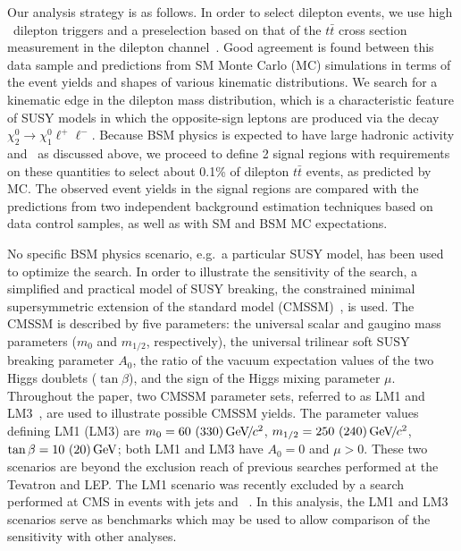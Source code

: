 Our analysis strategy is as follows. In order to select dilepton events, we
use high \pt\ dilepton triggers and a preselection based 
on that of the $t\bar{t}$ cross section measurement in the dilepton channel~\cite{ref:top}.
Good agreement is found between this
data sample and predictions from SM Monte Carlo (MC) simulations in terms of the event yields
and shapes of various kinematic distributions. 
We search for a kinematic edge in the dilepton mass distribution, which is a characteristic
feature of SUSY models in which the opposite-sign leptons are produced via the decay 
$\chi_2^0 \to \chi_1^0 \ell^+\ell^-$.
Because BSM physics is expected to have large hadronic activity and \MET\ as discussed
above, we  proceed to define 2 signal regions
with requirements on these quantities to select about 0.1\% 
of dilepton $t\bar{t}$ events, as predicted by MC.
The observed event yields in the signal regions are compared with the predictions from two 
independent background estimation techniques based on data control samples, 
as well as with SM and BSM MC expectations.

No specific BSM physics scenario, e.g.\ a particular SUSY model, has been used to optimize the search.
In order to illustrate the sensitivity of the search, a simplified and practical model of 
SUSY breaking, the constrained minimal supersymmetric
extension of the standard model (CMSSM)~\cite{CMSSM,CMSSM2}, is used. The CMSSM is described by
five parameters: the universal scalar and gaugino mass parameters ($m_0$ and $m_{1/2}$, respectively),
the universal trilinear soft SUSY breaking parameter $A_0$, the
ratio of the vacuum expectation values of the two Higgs doublets ($\tan\beta$), and the sign of the
Higgs mixing parameter $\mu$. 
Throughout the paper, two CMSSM parameter sets, referred
to as LM1 and LM3~\cite{TDR}, are used to illustrate possible CMSSM yields. The parameter values
defining LM1 (LM3) are $m_0 = 60~(330) {\,\text{Ge\hspace{-.08em}V\hspace{-0.16em}/\hspace{-0.08em}}c^\text{2}}$, $m_{1/2} = 250~(240) {\,\text{Ge\hspace{-.08em}V\hspace{-0.16em}/\hspace{-0.08em}}c^\text{2}}$, $\tan\beta = 10~(20)\,\text{Ge\hspace{-.08em}V}$; 
both LM1 and LM3 have $A_0 = 0$ and $\mu > 0$.  These two scenarios are beyond the exclusion reach 
of previous searches performed at the Tevatron and LEP. The LM1 scenario was recently excluded 
by a search performed at CMS in events with jets and \MET~\cite{ref:RA1}. 
In this analysis, the LM1 and LM3 scenarios serve as benchmarks which 
may be used to allow comparison of the sensitivity with other analyses.


